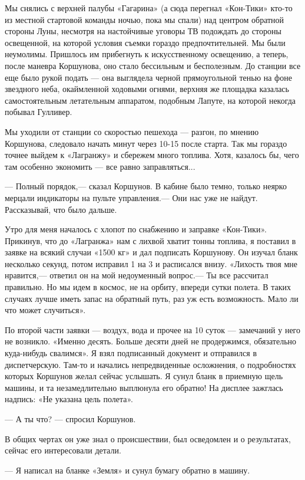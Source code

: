 \documentclass[11pt,a4paper,oneside]{article}
\begin{document}
Мы снялись с верхней палубы «Гагарина» (а сюда перегнал «Кон-Тики» кто-то из местной стартовой команды ночью, пока мы спали) над центром обратной стороны Луны, несмотря на настойчивые уговоры ТВ подождать до стороны освещенной, на которой условия съемки гораздо предпочтительней. Мы были неумолимы. Пришлось им прибегнуть к искусственному освещению, а теперь, после маневра Коршунова, оно стало бессильным и бесполезным. До станции все еще было рукой подать — она выглядела черной прямоугольной тенью на фоне звездного неба, окаймленной ходовыми огнями, верхняя же площадка казалась самостоятельным летательным аппаратом, подобным Лапуте, на которой некогда побывал Гулливер.

Мы уходили от станции со скоростью пешехода — разгон, по мнению Коршунова, следовало начать минут через 10-15 после старта. Так мы гораздо точнее выйдем к «Лагранжу» и сбережем много топлива. Хотя, казалось бы, чего там особенно экономить — все равно заправляться...

— Полный порядок,— сказал Коршунов. В кабине было темно, только  неярко мерцали индикаторы на пульте управления.— Они нас уже не найдут. Рассказывай, что было дальше.

Утро для меня началось с хлопот по снабжению и заправке «Кон-Тики». Прикинув, что до «Лагранжа» нам с лихвой хватит тонны топлива, я поставил в заявке на всякий случаи «1500 кг» и дал подписать Коршунову. Он изучал бланк несколько секунд, потом исправил 1 на 3 и расписался внизу. «Лихость твоя мне нравится,— ответил он на мой недоуменный вопрос.— Ты все рассчитал правильно. Но мы идем в космос, не на орбиту, впереди сутки полета. В таких случаях лучше иметь запас на обратный путь, раз уж есть возможность. Мало ли что может случиться».

По второй части заявки — воздух, вода и прочее на 10 суток — замечаний у него не возникло. «Именно десять. Больше десяти дней не продержимся, обязательно куда-нибудь свалимся». Я взял подписанный документ и отправился в диспетчерскую. Там-то и начались непредвиденные осложнения, о подробностях которых Коршунов желал сейчас услышать. Я сунул бланк в приемную щель машины, и та незамедлительно выплюнула его обратно! На дисплее зажглась надпись: «Не указана цель полета».

— А ты что? — спросил Коршунов.

В общих чертах он уже знал о происшествии, был осведомлен и о результатах, сейчас его интересовали детали.

— Я написал на бланке «Земля» и сунул бумагу обратно в машину.
\end{document}
